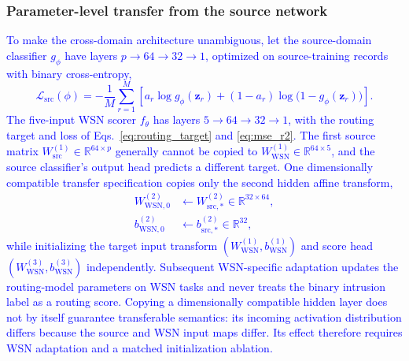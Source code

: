 \documentclass[pdflatex,sn-mathphys-num]{sn-jnl}
\newcommand{\Revised}[1]{\textcolor{blue}{#1}}
\begin{document}
\subsubsection{Parameter-level transfer from the source network}
\Revised{To make the cross-domain architecture unambiguous, let the source-domain classifier $g_\phi$ have layers $p\!\rightarrow\!64\!\rightarrow\!32\!\rightarrow\!1$, optimized on source-training records with binary cross-entropy,
\begin{equation}
 \mathcal L_{\mathrm{src}}(\phi)=-\frac1{M}\sum_{r=1}^{M}\left[a_r\log g_\phi(\mathbf z_r)+(1-a_r)\log\big(1-g_\phi(\mathbf z_r)\big)\right].\label{eq:src_bce_final}
\end{equation}
The five-input WSN scorer $f_\theta$ has layers $5\!\rightarrow\!64\!\rightarrow\!32\!\rightarrow\!1$, with the routing target and loss of Eqs.~\eqref{eq:routing_target} and \eqref{eq:mse_r2}. The first source matrix $W_{\mathrm{src}}^{(1)}\in\mathbb R^{64\times p}$ generally cannot be copied to $W_{\mathrm{WSN}}^{(1)}\in\mathbb R^{64\times5}$, and the source classifier's output head predicts a different target. One dimensionally compatible transfer specification copies only the second hidden affine transform,
\begin{align}
 W_{\mathrm{WSN},0}^{(2)}&\leftarrow W_{\mathrm{src},*}^{(2)}\in\mathbb R^{32\times64},\\
 b_{\mathrm{WSN},0}^{(2)}&\leftarrow b_{\mathrm{src},*}^{(2)}\in\mathbb R^{32},\label{eq:transfer_final}
\end{align}
while initializing the target input transform $(W_{\mathrm{WSN}}^{(1)},b_{\mathrm{WSN}}^{(1)})$ and score head $(W_{\mathrm{WSN}}^{(3)},b_{\mathrm{WSN}}^{(3)})$ independently. Subsequent WSN-specific adaptation updates the routing-model parameters on WSN tasks and never treats the binary intrusion label as a routing score. Copying a dimensionally compatible hidden layer does not by itself guarantee transferable semantics: its incoming activation distribution differs because the source and WSN input maps differ. Its effect therefore requires WSN adaptation and a matched initialization ablation.}
\end{document}
